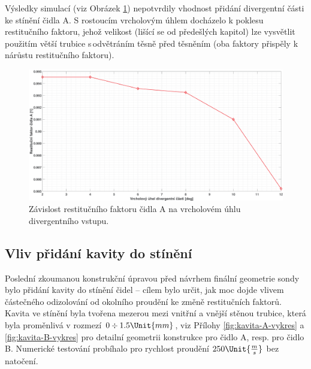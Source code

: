         Výsledky simulací (viz Obrázek \ref{fig:divergentni-cast-A}) nepotvrdily vhodnost přidání divergentní části ke stínění čidla A. S rostoucím vrcholovým úhlem docházelo k poklesu restitučního faktoru, jehož velikost (lišící se od předešlých kapitol) lze vysvětlit použitím větší trubice s\,odvětráním těsně před těsněním (oba faktory přispěly k nárůstu restitučního faktoru).
    
        \begin{figure}[ht!]
            \centering
            \includegraphics*[width=\textwidth]{400_SIMULACE_KONSTRUKCNICH_UPRAV/Grafy/08_divergentni_cast_A.eps}
            \caption{Závislost restitučního faktoru čidla A na vrcholovém úhlu divergentního vstupu.}
            \label{fig:divergentni-cast-A}
        \end{figure}
    
    \newpage
    \subsection{Vliv přidání kavity do stínění} \label{sec:kavita}
        Poslední zkoumanou konstrukční úpravou před návrhem finální geometrie sondy bylo přidání kavity do stínění čidel – cílem bylo určit, jak moc dojde vlivem částečného odizolování od okolního proudění ke změně restitučních faktorů. Kavita ve stínění byla tvořena mezerou mezi vnitřní a vnější stěnou trubice, která byla proměnlivá v rozmezí \linebreak $0 \div 1.5 \Unit{mm}$, viz Přílohy \ref{fig:kavita-A-vykres} a \ref{fig:kavita-B-vykres} pro detailní geometrii konstrukce pro čidlo A, resp. pro čidlo B. Numerické testování probíhalo pro rychlost proudění $250 \Unit{\frac{m}{s}}$ bez natočení.

